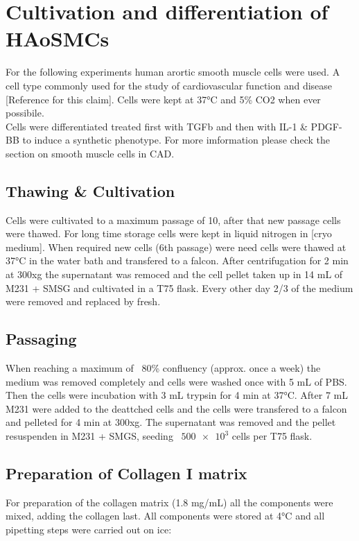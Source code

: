 \section{Cultivation and differentiation of HAoSMCs}
\label{sec:cultivation}
For the following experiments human arortic smooth muscle cells were used. A cell type commonly used for the study of cardiovascular function and disease [Reference for this claim]. Cells were kept at 37°C and 5\% CO2 when ever possibile.\\
Cells were differentiated treated first with TGFb and then with IL-1 \& PDGF-BB to induce a synthetic phenotype. For more imformation please check the section on smooth muscle cells in CAD.

    \subsection{Thawing \& Cultivation}
    Cells were cultivated to a maximum passage of 10, after that new passage cells were thawed. For long time storage cells were kept in liquid nitrogen in [cryo medium]. When required new cells (6th passage) were need cells were thawed at 37°C in the water bath and transfered to a falcon. After centrifugation for 2 min at 300xg the supernatant was remoced and the cell pellet taken up in 14 mL of M231 + SMSG and cultivated in a T75 flask. Every other day 2/3 of the medium were removed and replaced by fresh.

    \subsection{Passaging}
    When reaching a maximum of ~80\% confluency (approx. once a week) the medium was removed completely and cells were washed once with 5 mL of PBS. Then the cells were incubation with 3 mL trypsin for 4 min at 37°C. After 7 mL M231 were added to the deattched cells and the cells were transfered to a falcon and pelleted for 4 min at 300xg. The supernatant was removed and the pellet resuspenden in M231 + SMGS, seeding ~$\num{500e3}$ cells per T75 flask.

    \subsection{Preparation of Collagen I matrix}
    For preparation of the collagen matrix (1.8 mg/mL) all the components were mixed, adding the collagen last. All components were stored at 4°C and all pipetting steps were carried out on ice:

